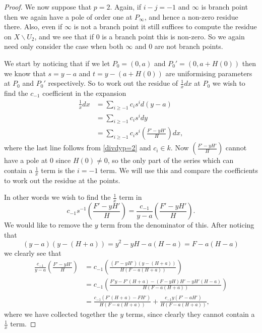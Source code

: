 \begin{proof}
We now suppose that $p=2$.
Again, if $i-j=-1$ and $\infty$ is branch point then we again have a pole of order one at $P_\infty$, and hence a non-zero residue there.
Also, even if $\infty$ is not a branch point it still suffices to compute the residue on $X\backslash U_2$, and we see that if $0$ is a branch point this is non-zero.
So we again need only consider the case when both $\infty$ and $0$ are not branch points.

We start by noticing that if we let $P_0 = (0,a)$ and $P_0' = (0,a+H(0))$ then we know that $s=y-a$ and $t=y-(a+H(0))$ are uniformising parameters at $P_0$ and $P_0'$ respectively.
So to work out the residue of $\frac{1}{x}dx$ at $P_0$ we wish to find the $c_{-1}$ coefficient in the expansion
\begin{align*}
\frac{1}{x}dx & = \sum_{i \geq -1} c_i s^i d(y-a) \\
& = \sum_{i\geq -1} c_i s^i dy \\
& = \sum_{i \geq -1} c_i s^i \left(\frac{F' - yH'}{H} \right) dx,
\end{align*}
where the last line follows from \eqref{divdyp=2} and $c_i \in k$.
Now $\left(\frac{F' -yH'}{H}\right)$ cannot have a pole at $0$ since $H(0) \neq 0$, so the only part of the series which can contain a $\frac{1}{x}$ term is the $i=-1$ term.
We will use this and compare the coefficients to work out the residue at the points. 

In other words we wish to find the $\frac{1}{x}$ term in 
\[
c_{-1}s^{-1}\left(\frac{F' - yH'}{H} \right) = \frac{c_{-1}}{y-a} \left( \frac{F' - yH'}{H} \right).
\]
We would like to remove the $y$ term from the denominator of this.
After noticing that 
\[
(y-a)(y-(H+a)) = y^2 - yH - a(H-a) = F- a(H-a)
\]
we clearly see that 
\begin{align*}
\frac{c_{-1}}{y-a} \left( \frac{F' - yH'}{H} \right) & = c_{-1} \left( \frac{(F'-yH')(y-(H+a))}{H(F-a(H+a))} \right) \\
& = c_{-1} \left( \frac{F'y - F'(H+a) - (F -yH)H' - yH'(H-a)}{H(F-a(H+a))} \right) \\
& = \frac{c_{-1}(F'(H+a) - FH')}{H(F-a(H+a))} + \frac{c_{-1}y(F' - aH')}{H(F-a(H+a))},
\end{align*}
where we have collected together the $y$ terms, since clearly they cannot contain a $\frac{1}{x}$ term.


\end{proof}
